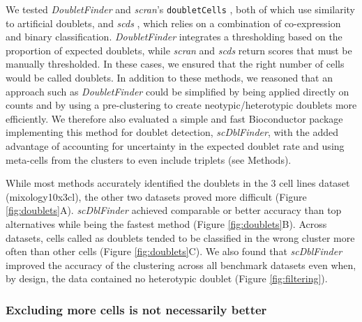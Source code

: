 \documentclass{bmcart}
\begin{document}
We tested \textit{DoubletFinder} \cite{mcginnisDoubletfinder2019} and \textit{scran}'s \texttt{doubletCells} \cite{LunScran2016}, both of which use similarity to artificial doublets, and \textit{scds} \cite{BaisScds2019}, which relies on a combination of co-expression and binary classification. \textit{DoubletFinder} integrates a thresholding based on the proportion of expected doublets, while \textit{scran} and \textit{scds} return scores that must be manually thresholded. In these cases, we ensured that the right number of cells would be called doublets. In addition to these methods, we reasoned that an approach such as \textit{DoubletFinder} could be simplified by being applied directly on counts and by using a pre-clustering to create neotypic/heterotypic doublets more efficiently. We therefore also evaluated a simple and fast Bioconductor package implementing this method for doublet detection, \textit{scDblFinder}, with the added advantage of accounting for uncertainty in the expected doublet rate and using meta-cells from the clusters to even include triplets (see Methods).

While most methods accurately identified the doublets in the 3 cell lines dataset (mixology10x3cl), the other two datasets proved more difficult (Figure \ref{fig:doublets}A). \textit{scDblFinder} achieved comparable or better accuracy than top alternatives while being the fastest method (Figure \ref{fig:doublets}B). Across datasets, cells called as doublets tended to be classified in the wrong cluster more often than other cells (Figure \ref{fig:doublets}C). We also found that \textit{scDblFinder} improved the accuracy of the clustering across all benchmark datasets even when, by design, the data contained no heterotypic doublet (Figure \ref{fig:filtering}).

\subsubsection*{Excluding more cells is not necessarily better}
\end{document}
